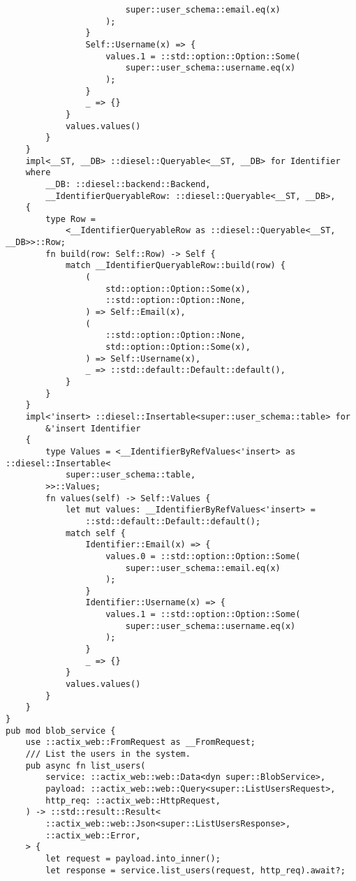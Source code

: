 \begin{verbatim}
                        super::user_schema::email.eq(x)
                    );
                }
                Self::Username(x) => {
                    values.1 = ::std::option::Option::Some(
                        super::user_schema::username.eq(x)
                    );
                }
                _ => {}
            }
            values.values()
        }
    }
    impl<__ST, __DB> ::diesel::Queryable<__ST, __DB> for Identifier
    where
        __DB: ::diesel::backend::Backend,
        __IdentifierQueryableRow: ::diesel::Queryable<__ST, __DB>,
    {
        type Row =
            <__IdentifierQueryableRow as ::diesel::Queryable<__ST, __DB>>::Row;
        fn build(row: Self::Row) -> Self {
            match __IdentifierQueryableRow::build(row) {
                (
                    std::option::Option::Some(x),
                    ::std::option::Option::None,
                ) => Self::Email(x),
                (
                    ::std::option::Option::None,
                    std::option::Option::Some(x),
                ) => Self::Username(x),
                _ => ::std::default::Default::default(),
            }
        }
    }
    impl<'insert> ::diesel::Insertable<super::user_schema::table> for
        &'insert Identifier
    {
        type Values = <__IdentifierByRefValues<'insert> as ::diesel::Insertable<
            super::user_schema::table,
        >>::Values;
        fn values(self) -> Self::Values {
            let mut values: __IdentifierByRefValues<'insert> =
                ::std::default::Default::default();
            match self {
                Identifier::Email(x) => {
                    values.0 = ::std::option::Option::Some(
                        super::user_schema::email.eq(x)
                    );
                }
                Identifier::Username(x) => {
                    values.1 = ::std::option::Option::Some(
                        super::user_schema::username.eq(x)
                    );
                }
                _ => {}
            }
            values.values()
        }
    }
}
pub mod blob_service {
    use ::actix_web::FromRequest as __FromRequest;
    /// List the users in the system.
    pub async fn list_users(
        service: ::actix_web::web::Data<dyn super::BlobService>,
        payload: ::actix_web::web::Query<super::ListUsersRequest>,
        http_req: ::actix_web::HttpRequest,
    ) -> ::std::result::Result<
        ::actix_web::web::Json<super::ListUsersResponse>,
        ::actix_web::Error,
    > {
        let request = payload.into_inner();
        let response = service.list_users(request, http_req).await?;

\end{verbatim}
